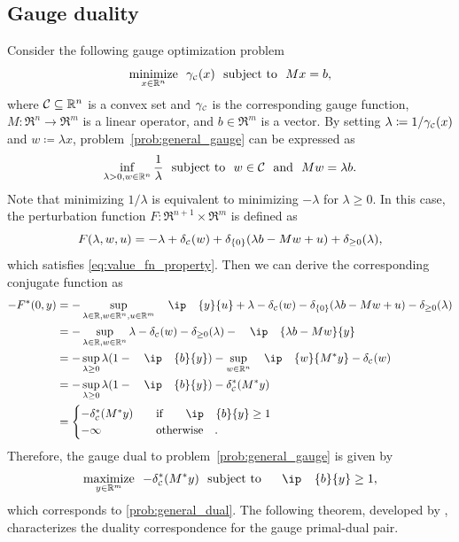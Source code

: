 \subsection{Gauge duality}
Consider the following gauge optimization problem 
\begin{equation} \label{prob:general_gauge} 
    \displaystyle\mathop{\hbox{\rm minimize}}_{x \in \mathbb{R}^n}\enspace \gamma_{\scriptscriptstyle\mathcal{C}}(x) \enspace\mathop{\hbox{\rm subject to}}\enspace Mx = b,
\end{equation}
where $\mathcal{C}\subseteq\mathbb{R}^n$ is a convex set and $\gamma_{\scriptscriptstyle\mathcal{C}}$ is the corresponding gauge function, $M:\Re^n\to\Re^m$ is a linear operator, and $b\in\Re^m$ is a vector. By setting 
$\lambda \coloneqq 1/\gamma_{\scriptscriptstyle\mathcal{C}}(x)$ and $w \coloneqq \lambda x$, problem~\eqref{prob:general_gauge} can be expressed as 
\begin{equation} \label{prob:general_gauge2} 
    \inf_{\lambda > 0, w \in \mathbb{R}^n} \frac{1}{\lambda} \enspace\mathop{\hbox{\rm subject to}}\enspace w \in \mathcal{C} \enspace\mathop{\hbox{\rm and}}\enspace Mw = \lambda b.
\end{equation}
Note that minimizing $1/\lambda$ is equivalent to minimizing $-\lambda$ for $\lambda \geq 0$. In this case, the perturbation function $F:\Re^{n+1} \times \Re^m$ is defined as 
\begin{equation}
    F(\lambda, w, u) = -\lambda + \delta_{\scriptscriptstyle\mathcal{C}}(w) + \delta_{\{0\}}(\lambda b - Mw + u) + \delta_{\geq 0}(\lambda),
\end{equation}
which satisfies \eqref{eq:value_fn_property}. 
Then we can derive the corresponding conjugate function as
\begin{align*}
    -F^*(0, y) &= -\sup_{\lambda\in\Re, w\in\Re^n, u\in\Re^m} \ip{y}{u} + \lambda - \delta\Cs(w) - \delta_{\{0\}}(\lambda b - Mw + u) - \delta_{\geq 0}(\lambda)
    \\&= -\sup_{\lambda\in\Re, w\in\Re^n} \lambda - \delta\Cs(w) - \delta_{\geq 0}(\lambda) - \ip{\lambda b - Mw}{y}
    \\&= -\sup_{\lambda\geq 0}  \lambda ( 1 - \ip{b}{y} ) - \sup_{w\in\Re^n} \ip{w}{M^*y} - \delta\Cs(w) 
    \\&= -\sup_{\lambda\geq 0}  \lambda ( 1 - \ip{b}{y} ) - \delta\Cs^*(M^*y)
    \\&= 
        \begin{cases}
            -\delta\Cs^*(M^*y) & \text{if} \ip{b}{y} \geq 1 \\
            -\infty & \text{otherwise}.
        \end{cases}
\end{align*}
Therefore, the gauge dual to problem~\eqref{prob:general_gauge} is given by
\begin{equation} \label{prob:general_gauge_dual}
    \maximize{y\in\Re^m} -\delta\Cs^*(M^*y) \st \ip{b}{y} \geq 1,
\end{equation}
which corresponds to \eqref{prob:general_dual}. 
The following theorem, developed by \citet{friedlander2014gauge}, characterizes the duality correspondence for the gauge primal-dual pair. 

